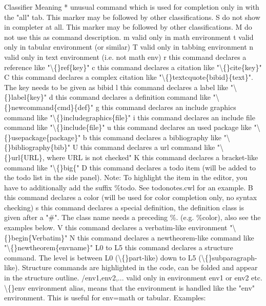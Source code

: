 \documentclass{article}
\begin{document}
	Classifier	Meaning
	*	unusual command which is used for completion only in with the "all" tab. This marker may be followed by other classifications.
	S	do not show in completer at all. This marker may be followed by other classifications.
	M	do not use this as command description.
	m	valid only in math environment
	t	valid only in tabular environment (or similar)
	T	valid only in tabbing environment
	n	valid only in text environment (i.e. not math env)
	r	this command declares a reference like "\textbackslash\{\}ref\{key\}"
	c	this command declares a citation like "\textbackslash\{\}cite\{key\}"
	C	this command declares a complex citation like "\textbackslash\{\}textcquote\{bibid\}\{text\}". The key needs to be given as bibid
	l	this command declares a label like "\textbackslash\{\}label\{key\}"
	d	this command declares a definition command like "\textbackslash\{\}newcommand\{cmd\}\{def\}"
	g	this command declares an include graphics command like "\textbackslash\{\}includegraphics\{file\}"
	i	this command declares an include file command like "\textbackslash\{\}include\{file\}"
	u	this command declares an used package like "\textbackslash\{\}usepackage\{package\}"
	b	this command declares a bibliography like "\textbackslash\{\}bibliography\{bib\}"
	U	this command declares a url command like "\textbackslash\{\}url\{URL\}, where URL is not checked"
	K	this command declares a bracket-like command like "\textbackslash\{\}big\{"
	D	this command declares a todo item (will be added to the todo list in the side panel). Note: To highlight the item in the editor, you have to additionally add the suffix \%todo. See todonotes.cwl for an example.
	B	this command declares a color (will be used for color completion only, no syntax checking)
	s	this command declares a special definition, the definition class is given after a "\#". The class name needs a preceding \%. (e.g. \%color), also see the examples below.
	V	this command declares a verbatim-like environment "\textbackslash\{\}begin\{Verbatim\}"
	N	this command declares a newtheorem-like command like "\textbackslash\{\}newtheorem\{envname\}"
	L0 to L5	this command declares a structure command. The level is between L0 (\textbackslash\{\}part-like) down to L5 (\textbackslash\{\}subparagraph-like). Structure commands are highlighted in the code, can be folded and appear in the structure outline.
	/env1,env2,...	valid only in environment env1 or env2 etc.
	\textbackslash\{\}env	environment alias, means that the environment is handled like the "env" environment. This is useful for env=math or tabular.
	Examples:
	
\end{document}
